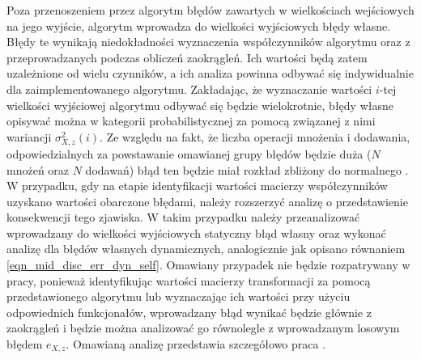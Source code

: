Poza przenoszeniem przez algorytm błędów zawartych w wielkościach wejściowych na jego wyjście, algorytm wprowadza do wielkości wyjściowych błędy własne. Błędy te wynikają niedokładności wyznaczenia współczynników algorytmu oraz z przeprowadzanych podczas obliczeń zaokrągleń. Ich wartości będą zatem uzależnione od wielu czynników, a ich analiza powinna odbywać się indywidualnie dla zaimplementowanego algorytmu. Zakładając, że wyznaczanie wartości $i$-tej wielkości wyjściowej algorytmu odbywać się będzie wielokrotnie, błędy własne opisywać można w kategorii probabilistycznej za pomocą związanej z nimi wariancji $\sigma_{X,z}^{2}(i)$. Ze względu na fakt, że liczba operacji mnożenia i dodawania, odpowiedzialnych za powstawanie omawianej grupy błędów będzie duża ($N$ mnożeń oraz $N$ dodawań) błąd ten będzie miał rozkład zbliżony do normalnego \cite{jcgm_guide}. W przypadku, gdy na etapie identyfikacji wartości macierzy współczynników uzyskano wartości obarczone błędami, należy rozszerzyć analizę o przedstawienie konsekwencji tego zjawiska. W takim przypadku należy przeanalizować wprowadzany do wielkości wyjściowych statyczny błąd własny oraz wykonać analizę dla błędów własnych dynamicznych, analogicznie jak opisano równaniem \eqref{eqn_mid_disc_err_dyn_self}. Omawiany przypadek nie będzie rozpatrywany w pracy, ponieważ identyfikując wartości macierzy transformacji za pomocą przedstawionego algorytmu lub wyznaczając ich wartości przy użyciu odpowiednich funkcjonałów, wprowadzany błąd wynikać będzie głównie z zaokrągleń i będzie można analizować go równolegle z wprowadzanym losowym błędem $e_{X,z}$. Omawianą analizę przedstawia szczegółowo praca \cite{jakubiec_system}.

